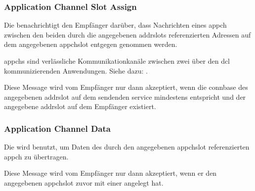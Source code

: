 \subsubsection{Application Channel Slot Assign}
\label{dcl-isproto-acsa}
Die \msg{\isprotoacsa} benachrichtigt den Empfänger darüber, dass Nachrichten eines \gls{appch} %
zwischen den beiden durch die angegebenen \glspl{addrslot} referenzierten Adressen auf dem
angegebenen \gls{appchslot} entgegen genommen werden.

\Glspl{appch} sind verlässliche Kommunikationkanäle zwischen zwei über den
\gls{dcl} kommunizierenden Anwendungen.
Siehe dazu: .

Diese Message wird vom Empfänger nur dann akzeptiert, wenn die \gls{connbase} des angegebenen
\gls{addrslot} auf dem sendenden \gls{service} mindestens  entspricht und der
angegebene \gls{addrslot} auf dem Empfänger existiert.

\isprotoacsabytefield


\subsubsection{Application Channel Data}
\label{dcl-isproto-acd}
Die \msg{\isprotoacd} wird benutzt, um Daten des durch den angegebenen \gls{appchslot}
referenzierten \gls{appch} zu übertragen.

Diese Message wird vom Empfänger nur dann akzeptiert, wenn er den angegebenen \gls{appchslot}
zuvor mit einer \msg{\isprotoacsa} angelegt hat.

\isprotoacdbytefield
